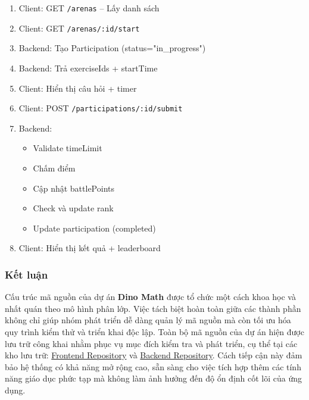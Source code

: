
\begin{enumerate}
\item Client: GET \texttt{/arenas} -- Lấy danh sách
\item Client: GET \texttt{/arenas/:id/start}
\item Backend: Tạo Participation (status="in\_progress")
\item Backend: Trả exerciseIds + startTime
\item Client: Hiển thị câu hỏi + timer
\item Client: POST \texttt{/participations/:id/submit}
\item Backend:
  \begin{itemize}
  \item Validate timeLimit
  \item Chấm điểm
  \item Cập nhật battlePoints
  \item Check và update rank
  \item Update participation (completed)
  \end{itemize}
\item Client: Hiển thị kết quả + leaderboard
\end{enumerate}

\subsubsection{Kết luận}
Cấu trúc mã nguồn của dự án \textbf{Dino Math} được tổ chức một cách khoa học và nhất quán theo mô hình phân lớp. Việc tách biệt hoàn toàn giữa các thành phần không chỉ giúp nhóm phát triển dễ dàng quản lý mã nguồn mà còn tối ưu hóa quy trình kiểm thử và triển khai độc lập. Toàn bộ mã nguồn của dự án hiện được lưu trữ công khai nhằm phục vụ mục đích kiểm tra và phát triển, cụ thể tại các kho lưu trữ: \href{https://github.com/coldwind444/dino-fe.git}{Frontend Repository} và \href{https://github.com/boyastro/dino_math_backend.git}{Backend Repository}. Cách tiếp cận này đảm bảo hệ thống có khả năng mở rộng cao, sẵn sàng cho việc tích hợp thêm các tính năng giáo dục phức tạp mà không làm ảnh hưởng đến độ ổn định cốt lõi của ứng dụng.

\fi
